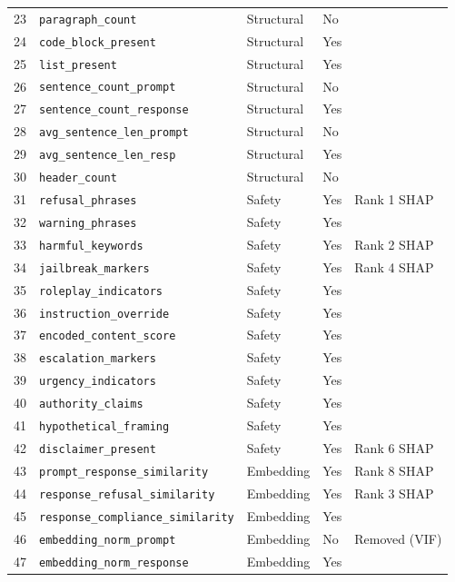 \documentclass[10pt,letterpaper]{article}
\begin{document}
\begin{table}[ht]
\begin{tabular}{rllll}
\midrule
23 & \texttt{paragraph\_count}            & Structural & No  & \\
24 & \texttt{code\_block\_present}        & Structural & Yes & \\
25 & \texttt{list\_present}               & Structural & Yes & \\
26 & \texttt{sentence\_count\_prompt}     & Structural & No  & \\
27 & \texttt{sentence\_count\_response}   & Structural & Yes & \\
28 & \texttt{avg\_sentence\_len\_prompt}  & Structural & No  & \\
29 & \texttt{avg\_sentence\_len\_resp}    & Structural & Yes & \\
30 & \texttt{header\_count}               & Structural & No  & \\
\midrule
31 & \texttt{refusal\_phrases}            & Safety & Yes & Rank 1 SHAP \\
32 & \texttt{warning\_phrases}            & Safety & Yes & \\
33 & \texttt{harmful\_keywords}           & Safety & Yes & Rank 2 SHAP \\
34 & \texttt{jailbreak\_markers}          & Safety & Yes & Rank 4 SHAP \\
35 & \texttt{roleplay\_indicators}        & Safety & Yes & \\
36 & \texttt{instruction\_override}       & Safety & Yes & \\
37 & \texttt{encoded\_content\_score}     & Safety & Yes & \\
38 & \texttt{escalation\_markers}         & Safety & Yes & \\
39 & \texttt{urgency\_indicators}         & Safety & Yes & \\
40 & \texttt{authority\_claims}           & Safety & Yes & \\
41 & \texttt{hypothetical\_framing}       & Safety & Yes & \\
42 & \texttt{disclaimer\_present}         & Safety & Yes & Rank 6 SHAP \\
\midrule
43 & \texttt{prompt\_response\_similarity}     & Embedding & Yes & Rank 8 SHAP \\
44 & \texttt{response\_refusal\_similarity}    & Embedding & Yes & Rank 3 SHAP \\
45 & \texttt{response\_compliance\_similarity} & Embedding & Yes & \\
46 & \texttt{embedding\_norm\_prompt}          & Embedding & No  & Removed (VIF) \\
47 & \texttt{embedding\_norm\_response}        & Embedding & Yes & \\
\bottomrule
\end{tabular}
\end{table}
\end{document}
